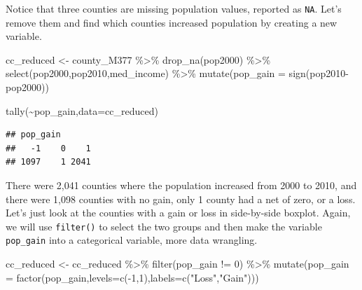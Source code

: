 \documentclass[
]{book}
\newenvironment{Shaded}{\begin{snugshade}}{\end{snugshade}}
\newcommand{\AttributeTok}[1]{\textcolor[rgb]{0.77,0.63,0.00}{#1}}
\newcommand{\DecValTok}[1]{\textcolor[rgb]{0.00,0.00,0.81}{#1}}
\newcommand{\FunctionTok}[1]{\textcolor[rgb]{0.00,0.00,0.00}{#1}}
\newcommand{\NormalTok}[1]{#1}
\newcommand{\OtherTok}[1]{\textcolor[rgb]{0.56,0.35,0.01}{#1}}
\newcommand{\SpecialCharTok}[1]{\textcolor[rgb]{0.00,0.00,0.00}{#1}}
\newcommand{\StringTok}[1]{\textcolor[rgb]{0.31,0.60,0.02}{#1}}
\begin{document}
Notice that three counties are missing population values, reported as \texttt{NA}. Let's remove them and find which counties increased population by creating a new variable.

\begin{Shaded}
\begin{Highlighting}[]
\NormalTok{cc\_reduced }\OtherTok{\textless{}{-}}\NormalTok{ county\_M377 }\SpecialCharTok{\%\textgreater{}\%}
  \FunctionTok{drop\_na}\NormalTok{(pop2000) }\SpecialCharTok{\%\textgreater{}\%}
  \FunctionTok{select}\NormalTok{(pop2000,pop2010,med\_income) }\SpecialCharTok{\%\textgreater{}\%}
  \FunctionTok{mutate}\NormalTok{(}\AttributeTok{pop\_gain =} \FunctionTok{sign}\NormalTok{(pop2010}\SpecialCharTok{{-}}\NormalTok{pop2000))}
\end{Highlighting}
\end{Shaded}

\begin{Shaded}
\begin{Highlighting}[]
\FunctionTok{tally}\NormalTok{(}\SpecialCharTok{\textasciitilde{}}\NormalTok{pop\_gain,}\AttributeTok{data=}\NormalTok{cc\_reduced)}
\end{Highlighting}
\end{Shaded}

\begin{verbatim}
## pop_gain
##   -1    0    1 
## 1097    1 2041
\end{verbatim}

There were 2,041 counties where the population increased from 2000 to 2010, and there were 1,098 counties with no gain, only 1 county had a net of zero, or a loss. Let's just look at the counties with a gain or loss in side-by-side boxplot. Again, we will use \texttt{filter()} to select the two groups and then make the variable \texttt{pop\_gain} into a categorical variable, more data wrangling.

\begin{Shaded}
\begin{Highlighting}[]
\NormalTok{cc\_reduced }\OtherTok{\textless{}{-}}\NormalTok{ cc\_reduced }\SpecialCharTok{\%\textgreater{}\%}
  \FunctionTok{filter}\NormalTok{(pop\_gain }\SpecialCharTok{!=} \DecValTok{0}\NormalTok{) }\SpecialCharTok{\%\textgreater{}\%}
  \FunctionTok{mutate}\NormalTok{(}\AttributeTok{pop\_gain =} \FunctionTok{factor}\NormalTok{(pop\_gain,}\AttributeTok{levels=}\FunctionTok{c}\NormalTok{(}\SpecialCharTok{{-}}\DecValTok{1}\NormalTok{,}\DecValTok{1}\NormalTok{),}\AttributeTok{labels=}\FunctionTok{c}\NormalTok{(}\StringTok{"Loss"}\NormalTok{,}\StringTok{"Gain"}\NormalTok{)))}
\end{Highlighting}
\end{Shaded}
\end{document}
